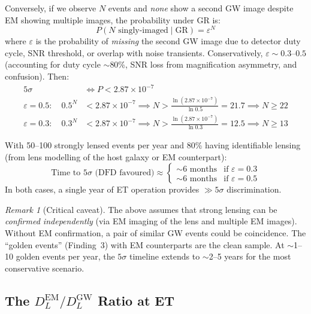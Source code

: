 \documentclass[11pt]{article}
\theoremstyle{definition}
\theoremstyle{remark}
\newtheorem{remark}[theorem]{Remark}
\newcommand{\ee}[1]{\times10^{#1}}
\begin{document}
Conversely, if we observe $N$ events and \emph{none} show a second GW
image despite EM showing multiple images, the probability under GR is:
\begin{equation}
P(\text{$N$ singly-imaged} \mid \text{GR}) = \varepsilon^N
\end{equation}
where $\varepsilon$ is the probability of \emph{missing} the second GW
image due to detector duty cycle, SNR threshold, or overlap with noise
transients. Conservatively, $\varepsilon \sim 0.3$--$0.5$ (accounting for
duty cycle $\sim$80\%, SNR loss from magnification asymmetry, and
confusion). Then:
\begin{align}
5\sigma &\Leftrightarrow P < 2.87\ee{-7} \\
\varepsilon = 0.5: \quad 0.5^N &< 2.87\ee{-7}
  \implies N > \frac{\ln(2.87\ee{-7})}{\ln 0.5} = 21.7
  \implies N \geq 22 \\
\varepsilon = 0.3: \quad 0.3^N &< 2.87\ee{-7}
  \implies N > \frac{\ln(2.87\ee{-7})}{\ln 0.3} = 12.5
  \implies N \geq 13
\end{align}

With 50--100 strongly lensed events per year and 80\% having identifiable
lensing (from lens modelling of the host galaxy or EM counterpart):
\begin{equation}
\boxed{
\text{Time to $5\sigma$ (DFD favoured)} \approx
\begin{cases}
\sim 6\text{ months} & \text{if } \varepsilon = 0.3 \\
\sim 6\text{ months} & \text{if } \varepsilon = 0.5
\end{cases}
}
\end{equation}
In both cases, a single year of ET operation provides $\gg 5\sigma$
discrimination.

\begin{remark}[Critical caveat]
The above assumes that strong lensing can be \emph{confirmed independently}
(via EM imaging of the lens and multiple EM images). Without EM confirmation,
a pair of similar GW events could be coincidence. The ``golden events''
(Finding~3) with EM counterparts are the clean sample. At $\sim$1--10
golden events per year, the $5\sigma$ timeline extends to $\sim$2--5 years
for the most conservative scenario.
\end{remark}

\subsection{The $D_L^{\mathrm{EM}}/D_L^{\mathrm{GW}}$ Ratio at ET}
\end{document}
